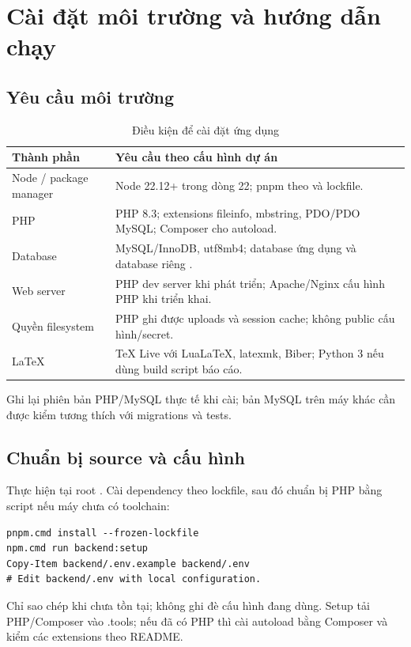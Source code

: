 \section{Cài đặt môi trường và hướng dẫn chạy}
\label{sec:installation}
\subsection{Yêu cầu môi trường}
\begin{table}[H]\centering
\caption{Điều kiện để cài đặt ứng dụng}\label{tab:environment}
\begin{tabularx}{\linewidth}{@{}P{3.4cm}Y@{}}\toprule
Thành phần & Yêu cầu theo cấu hình dự án\\\midrule
Node / package manager & Node 22.12+ trong dòng 22; pnpm theo  và lockfile.\\
PHP & PHP 8.3; extensions fileinfo, mbstring, PDO/PDO MySQL; Composer cho autoload.\\
Database & MySQL/InnoDB, utf8mb4; database ứng dụng và database riêng .\\
Web server & PHP dev server khi phát triển; Apache/Nginx cấu hình PHP khi triển khai.\\
Quyền filesystem & PHP ghi được uploads và session cache; không public cấu hình/secret.\\
LaTeX & TeX Live với LuaLaTeX, latexmk, Biber; Python 3 nếu dùng build script báo cáo.\\
\bottomrule\end{tabularx}
\end{table}
Ghi lại phiên bản PHP/MySQL thực tế khi cài; bản MySQL trên máy khác cần được kiểm tương thích với migrations và tests.

\subsection{Chuẩn bị source và cấu hình}
Thực hiện tại root . Cài dependency theo lockfile, sau đó chuẩn bị PHP bằng script nếu máy chưa có toolchain:
\begin{lstlisting}[caption={Chuẩn bị môi trường phát triển trên PowerShell}]
pnpm.cmd install --frozen-lockfile
npm.cmd run backend:setup
Copy-Item backend/.env.example backend/.env
# Edit backend/.env with local configuration.
\end{lstlisting}
Chỉ sao chép  khi chưa tồn tại; không ghi đè cấu hình đang dùng. Setup tải PHP/Composer vào .tools; nếu đã có PHP thì cài autoload bằng Composer và kiểm các extensions theo README.

